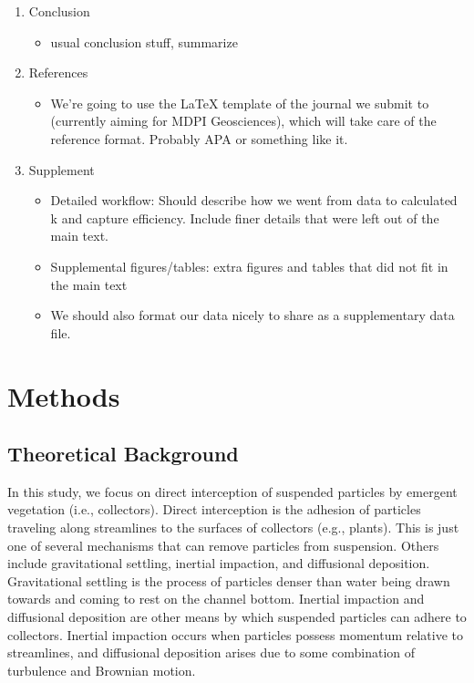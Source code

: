 \documentclass{scrreprt}
\begin{document}
\begin{enumerate}
    \item Conclusion
    \begin{itemize}
        \item usual conclusion stuff, summarize
    \end{itemize}
    
    \item References
    \begin{itemize}
        \item We're going to use the LaTeX template of the journal we submit to (currently aiming for MDPI Geosciences), which will take care of the reference format. Probably APA or something like it.
    \end{itemize}
    
    \item Supplement
    \begin{itemize}
        \item Detailed workflow: Should describe how we went from data to calculated k and capture efficiency. Include finer details that were left out of the main text.
        \item Supplemental figures/tables: extra figures and tables that did not fit in the main text
        \item We should also format our data nicely to share as a supplementary data file.
    \end{itemize}
    
\end{enumerate}

\setcounter{chapter}{1}

\chapter{Methods}

\section{Theoretical Background}

In this study, we focus on direct interception of suspended particles by emergent vegetation (i.e., collectors). Direct interception is the adhesion of particles traveling along streamlines to the surfaces of collectors (e.g., plants). This is just one of several mechanisms that can remove particles from suspension. Others include gravitational settling, inertial impaction, and diffusional deposition. Gravitational settling is the process of particles denser than water being drawn towards and coming to rest on the channel bottom. Inertial impaction and diffusional deposition are other means by which suspended particles can adhere to collectors. Inertial impaction occurs when particles possess momentum relative to streamlines, and diffusional deposition arises due to some combination of turbulence and Brownian motion.
\end{document}
